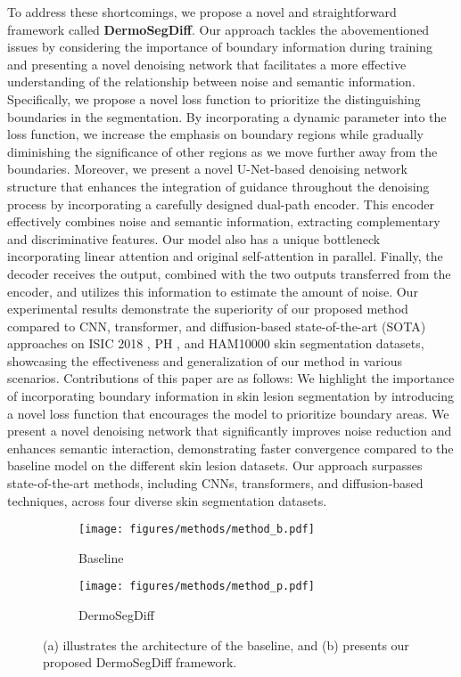 \documentclass[runningheads]{llncs}
\begin{document}
To address these shortcomings, we propose a novel and straightforward framework called \textbf{DermoSegDiff}. Our approach tackles the abovementioned issues by considering the importance of boundary information during training and presenting a novel denoising network that facilitates a more effective understanding of the relationship between noise and semantic information. Specifically, we propose a novel loss function to prioritize the distinguishing boundaries in the segmentation. By incorporating a dynamic parameter into the loss function, we increase the emphasis on boundary regions while gradually diminishing the significance of other regions as we move further away from the boundaries. Moreover, we present a novel U-Net-based denoising network structure that enhances the integration of guidance throughout the denoising process by incorporating a carefully designed dual-path encoder. This encoder effectively combines noise and semantic information, extracting complementary and discriminative features. Our model also has a unique bottleneck incorporating linear attention \cite{shen2021efficient} and original self-attention \cite{dosovitskiy2020image} in parallel. Finally, the decoder receives the output, combined with the two outputs transferred from the encoder, and utilizes this information to estimate the amount of noise. Our experimental results demonstrate the superiority of our proposed method compared to CNN, transformer, and diffusion-based state-of-the-art (SOTA) approaches on ISIC 2018 \cite{codella2019skin}, PH \cite{mendoncca2013ph}, and HAM10000 \cite{tschandl2018ham10000} skin segmentation datasets, showcasing the effectiveness and generalization of our method in various scenarios. Contributions of this paper are as follows:  We highlight the importance of incorporating boundary information in skin lesion segmentation by introducing a novel loss function that encourages the model to prioritize boundary areas.  We present a novel denoising network that significantly improves noise reduction and enhances semantic interaction, demonstrating faster convergence compared to the baseline model on the different skin lesion datasets.  Our approach surpasses state-of-the-art methods, including CNNs, transformers, and diffusion-based techniques, across four diverse skin segmentation datasets.


\begin{figure*}[!t]
	\centering
	\begin{subfigure}{0.48\textwidth}
\texttt{[image: figures/methods/method\_b.pdf]}
		\caption{Baseline}
		\label{fig:baseline}
	\end{subfigure} \hfill
	\begin{subfigure}{0.48\textwidth}
\texttt{[image: figures/methods/method\_p.pdf]}
		\caption{DermoSegDiff}
		\label{fig:pipeline}
	\end{subfigure}
	\caption{(a) illustrates the architecture of the baseline, and (b) presents our proposed DermoSegDiff framework.}
 \label{fig:method}
\end{figure*}
\end{document}
